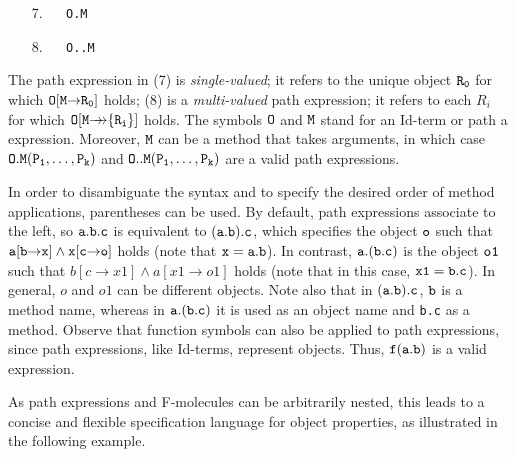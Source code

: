 \documentclass[11pt]{article}
\newcommand{\fd}{\ensuremath{{\rightarrow}}}                   %
\newcommand{\mvd}{\ensuremath{{\rightarrow\!\!\!\!\rightarrow}}}  %
\begin{document}
  \medskip

\begin{enumerate} 
\item[7.]\label{eq-path-fun} ~~ {\tt O.M}
\item[8.]\label{eq-path-set} ~~ {\tt O..M} 
\end{enumerate} \medskip

\noindent
The path expression in (7) is \emph{single-valued}; it refers to the unique
object $\tt R_0$ for which $\tt O[M\fd R_0]$ holds; (8) is a
\emph{multi-valued} path expression; it refers to each $R_i$ for which $\tt
O[M\mvd\{R_i\}]$ holds.  The symbols $\tt O$ and $\tt M$ stand for an
Id-term or path a expression.  Moreover, $\tt M$ can be a method that takes
arguments, in which case $\tt O.M(P_1,\dots,P_k)$ and $\tt
O..M(P_1,\dots,P_k)$ are a valid path expressions.
  
In order to disambiguate the syntax and to specify the desired order of
method applications, parentheses can be used. By default, path expressions
associate to the left, so $\tt a.b.c$ is equivalent to $\tt (a.b).c$, which
specifies the object $\tt o$ such that $\tt a[b\fd x] \land x[c\fd o]$
holds (note that $\tt x=a.b$). In contrast, $\tt a.(b.c)$ is the object
$\tt o1$ such that $b[c\fd x1] \land a[x1\fd o1]$ holds (note that in this
case, $\tt x1=b.c$). In general, $o$ and $o1$ can be different objects.
Note also that in $\tt (a.b).c$, $\tt b$ is a method name, whereas in $\tt
a.(b.c)$ it is used as an object name and {\tt b.c} as a method.  Observe
that function symbols can also be applied to path expressions, since path
expressions, like Id-terms, represent objects. Thus, $\tt f(a.b)$
is a valid expression.

As path expressions and F-molecules can be arbitrarily nested, this leads
to a concise and flexible specification language for object properties, as
illustrated in the following example.
\end{document}
